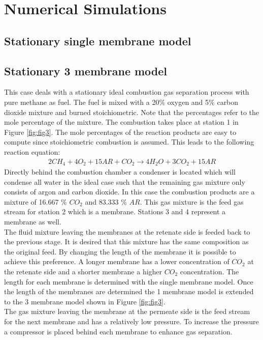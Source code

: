 \section{Numerical Simulations}

\subsection{Stationary single membrane model}
\subsection{Stationary 3 membrane model}
This case deals with a stationary ideal combustion gas separation process with pure methane as fuel. The fuel is mixed with a 20$\%$ oxygen and 5$\%$ carbon dioxide mixture and burned stoichiometric. Note that the percentages refer to the mole percentage of the mixture. The combustion takes place at station 1 in Figure \ref{fig:fig3}. The mole percentages of the reaction products are easy to compute since stoichiometric combustion is assumed. This leads to the following reaction equation:
\begin{align}
	2CH_4 + 4O_2 + 15AR + CO_2 \rightarrow 4H_2O + 3CO_2 + 15AR 
\end{align} 
Directly behind the combustion chamber a condenser is located which will condense all water in the ideal case such that the remaining gas mixture only consists of argon and carbon dioxide. In this case the combustion products are a mixture of 16.667 $\%$ $CO_2$ and 83.333 $\%$ $AR$. This gas mixture is the feed gas stream for station 2 which is a membrane. Stations 3 and 4 represent a membrane as well. \\

The fluid mixture leaving the membranes at the retenate side is feeded back to the previous stage. It is desired that this mixture has the same composition as the original feed. By changing the length of the membrane it is possible to achieve this preference. A longer membrane has a lower concentration of $CO_2$ at the retenate side and a shorter membrane a higher $CO_2$ concentration. The length for each membrane is determined with the single membrane model. Once the length of the membranes are determined the 1 membrane model is extended to the 3 membrane model shown in Figure \ref{fig:fig3}.\\ 
 
The gas mixture leaving the membrane at the permeate side is the feed stream for the next membrane and has a relatively low pressure. To increase the pressure a compressor is placed behind each membrane to enhance gas separation. 

